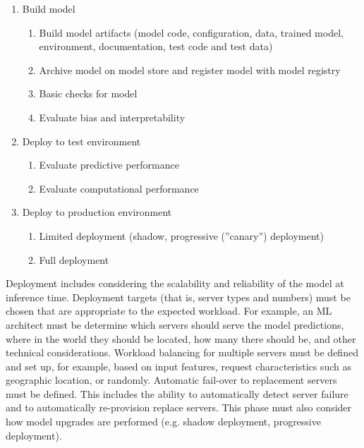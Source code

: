 \begin{enumerate}
\item Build model
\begin{enumerate}
   \item Build model artifacts (model code, configuration, data, trained model, environment, documentation, test code and test data)
   \item Archive model on model store and register model with model registry
   \item Basic checks for model
   \item Evaluate bias and interpretability 
\end{enumerate}
\item Deploy to test environment
\begin{enumerate}
    \item Evaluate predictive performance
    \item Evaluate computational performance
\end{enumerate}
\item Deploy to production environment
\begin{enumerate}
   \item Limited deployment (shadow, progressive (''canary'') deployment)
   \item Full deployment
\end{enumerate}
\end{enumerate} 

Deployment includes considering the scalability and reliability of the model at inference time. Deployment targets (that is, server types and numbers) must be chosen that are appropriate to the expected workload. For example, an ML architect must be determine which servers should serve the model predictions, where in the world they should be located, how many there should be, and other technical considerations. Workload balancing for multiple servers must be defined and set up, for example, based on input features, request characteristics such as geographic location, or randomly. Automatic fail-over to replacement servers must be defined. This includes the ability to automatically detect server failure and to automatically re-provision replace servers. This phase must also consider how model upgrades are performed (e.g. shadow deployment, progressive deployment).

